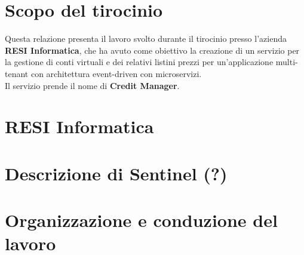 \section{Scopo del tirocinio}
Questa relazione presenta il lavoro svolto durante il tirocinio presso l'azienda \textbf{RESI Informatica}, che ha avuto come obiettivo la creazione di un servizio per la
gestione di conti virtuali e dei relativi listini prezzi per un'applicazione multi-tenant con architettura event-driven con microservizi.
\\
Il servizio prende il nome di \textbf{Credit Manager}.

\section{RESI Informatica}

\section{Descrizione di Sentinel (?)}


\section{Organizzazione e conduzione del lavoro}
